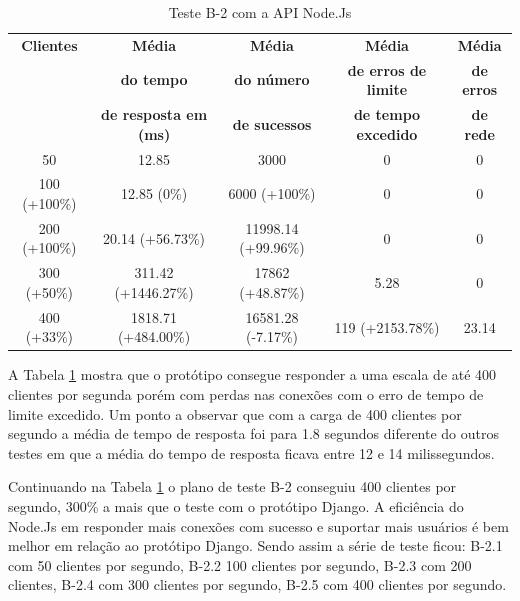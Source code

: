   \begin{table}[H]
    \centering
    \footnotesize
    \setlength{\abovecaptionskip}{0pt}
    \setlength{\belowcaptionskip}{0pt}
    \caption[Teste B-2 com a API Node.Js]{Teste B-2 com a API Node.Js}
    \label{tab:teste-b-2}
    \begin{tabular}{c|c|c|c|c}
      \hline \hline
      \textbf{Clientes} & \textbf{Média} &	\textbf{Média} & \textbf{Média} & \textbf{Média}  \\
      {}		& \textbf{do tempo} &   \textbf{do número } & \textbf{de erros de limite} & \textbf{de erros}  \\
      {}		& \textbf{de resposta em (ms) } &\textbf{de sucessos } & \textbf{de tempo excedido} & \textbf{de rede} \\
      \hline \hline
      50 &			12.85		 & 		3000 &					0 &					0 \\
      100 (+100\%)&		12.85 (0\%) & 			6000 (+100\%) & 			0 &					0 \\
      200 (+100\%)&		20.14 (+56.73\%) & 		11998.14 (+99.96\%) & 			0 &					0 \\
      300 (+50\%)&		311.42 (+1446.27\%) & 		17862 (+48.87\%) & 			5.28 &					0 \\
      400 (+33\%)&		1818.71 (+484.00\%) & 		16581.28 (-7.17\%) & 			119 (+2153.78\%) &			23.14 \\
      \hline \hline
    \end{tabular}
  \end{table}

  A Tabela \ref{tab:teste-b-2} mostra que o protótipo consegue responder a uma escala de até 400 clientes por segunda
  porém com perdas nas conexões com o erro de tempo de limite excedido. Um ponto a observar que com a carga de 400 clientes por segundo
  a média de tempo de resposta foi para 1.8 segundos diferente do outros testes em que a média do tempo de resposta ficava entre 12 e 14
  milissegundos.

  Continuando na Tabela \ref{tab:teste-b-2} o plano de teste B-2 conseguiu 400 clientes por segundo, 300\% a mais que o teste
  com o protótipo Django. A eficiência do Node.Js em responder mais conexões com sucesso e suportar
  mais usuários é bem melhor em relação ao protótipo Django. Sendo assim a série de teste ficou: B-2.1 com 50 clientes por segundo,
  B-2.2 100 clientes por segundo,  B-2.3 com 200 clientes, B-2.4 com 300 clientes por segundo, B-2.5 com 400 clientes por segundo.

